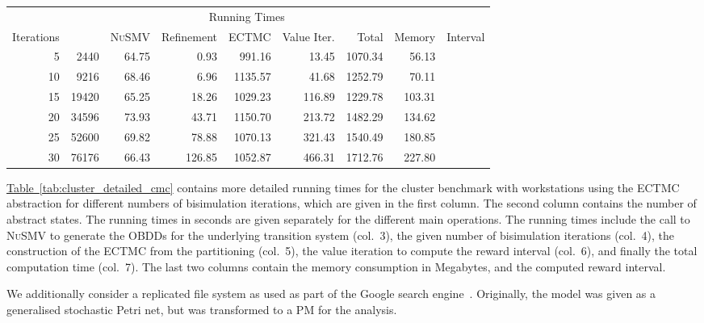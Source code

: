 \documentclass[10pt,twocolumn]{article}
\newcommand{\NUSMV}{\textsc{NuSMV}\xspace}
\newcommand{\reftab}[1]{\texorpdfstring{\hyperref[tab:#1]{Table~\ref*{tab:#1}}}{Table~\ref*{tab:#1}}}
\begin{document}
\begin{table*}[tb]
  \centering
  \caption{Detailed experimental results for the workstation cluster (, ) using the ECTMC abstraction}
  \label{tab:cluster_detailed_cmc}
\begin{tabular}{|rr|rrrrr|r|c|}
  \hline
             &              & \multicolumn{5}{c|}{Running Times}         &             &  \\
  Iterations &  & \NUSMV & Refinement & ECTMC & Value Iter. & Total & Memory & Interval \\
  \hline
  5 & 2440 & 64.75 & 0.93 & 991.16 & 13.45 & 1070.34 & 56.13 &  \\
  10 & 9216 & 68.46 & 6.96 & 1135.57 & 41.68 & 1252.79 & 70.11 &  \\
  15 & 19420 & 65.25 & 18.26 & 1029.23 & 116.89 & 1229.78 & 103.31 &  \\
  20 & 34596 & 73.93 & 43.71 & 1150.70 & 213.72 & 1482.29 & 134.62 &  \\
  25 & 52600 & 69.82 & 78.88 & 1070.13 & 321.43 & 1540.49 & 180.85 &  \\
  30 & 76176 & 66.43 & 126.85 & 1052.87 & 466.31 & 1712.76 & 227.80 &  \\
  \hline
\end{tabular}
\end{table*}
\reftab{cluster_detailed_cmc} contains more detailed running times for
the cluster benchmark with  workstations using the ECTMC
abstraction for different numbers of bisimulation iterations, which
are given in the first column. The second column contains the number
of abstract states. The running times in seconds are given separately
for the different main operations. The running times include the call to \NUSMV to generate the
OBDDs for the underlying transition system (col.~3), the given number
of bisimulation iterations (col.~4), the construction of the ECTMC
from the partitioning (col.~5), the value iteration to compute the
reward interval (col.~6), and finally the total computation time
(col.~7). The last two columns contain the memory consumption in
Megabytes, and the computed reward interval.


We additionally consider a replicated file system as used as part of
the Google search engine~\cite{ClothH05,BaierHHHK12}. Originally, the model was given as a
generalised stochastic Petri net, but was transformed to a PM for the
analysis.
\end{document}

